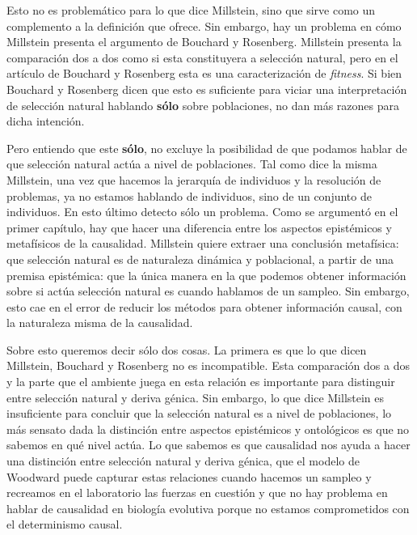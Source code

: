 Esto no es problemático para lo que dice Millstein, sino que sirve como un complemento a la definición que ofrece. Sin embargo, hay un problema en cómo Millstein presenta el argumento de Bouchard y Rosenberg. Millstein presenta la comparación dos a dos como si esta constituyera a selección natural, pero en el artículo de Bouchard y Rosenberg esta es una caracterización de \emph{fitness}. Si bien Bouchard y Rosenberg dicen que esto es suficiente para viciar una interpretación de selección natural hablando \textbf{sólo} sobre poblaciones, no dan más razones para dicha intención.

Pero entiendo que este \textbf{sólo}, no excluye la posibilidad de que podamos hablar de que selección natural actúa a nivel de poblaciones. Tal como dice la misma Millstein, una vez que hacemos la jerarquía de individuos y la resolución de problemas, ya no estamos hablando de individuos, sino de un conjunto de individuos. En esto último detecto sólo un problema. Como se argumentó en el primer capítulo, hay que hacer una diferencia entre los aspectos epistémicos y metafísicos de la causalidad. Millstein quiere extraer una conclusión metafísica: que selección natural es de naturaleza dinámica y poblacional, a partir de una premisa epistémica: que la única manera en la que podemos obtener información sobre si actúa selección natural es cuando hablamos de un sampleo. Sin embargo, esto cae en el error de reducir los métodos para obtener información causal, con la naturaleza misma de la causalidad.

Sobre esto queremos decir sólo dos cosas. La primera es que lo que dicen Millstein, Bouchard y Rosenberg no es incompatible. Esta comparación dos a dos y la parte que el ambiente juega en esta relación es importante para distinguir entre selección natural y deriva génica. Sin embargo, lo que dice Millstein es insuficiente para concluir que la selección natural es a nivel de poblaciones, lo más sensato dada la distinción entre aspectos epistémicos y ontológicos es que no sabemos en qué nivel actúa. Lo que sabemos es que causalidad nos ayuda a hacer una distinción entre selección natural y deriva génica, que el modelo de Woodward puede capturar estas relaciones cuando hacemos un sampleo y recreamos en el laboratorio las fuerzas en cuestión y que no hay problema en hablar de causalidad en biología evolutiva porque no estamos comprometidos con el determinismo causal.


